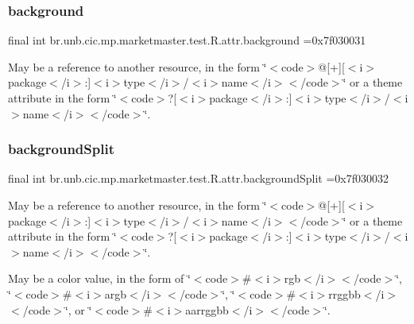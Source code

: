 \subsubsection{\texorpdfstring{background}{background}}
{\footnotesize\ttfamily final int br.\+unb.\+cic.\+mp.\+marketmaster.\+test.\+R.\+attr.\+background =0x7f030031\hspace{0.3cm}{\ttfamily [static]}}

May be a reference to another resource, in the form \char`\"{}$<$code$>$@\mbox{[}+\mbox{]}\mbox{[}$<$i$>$package$<$/i$>$\+:\mbox{]}$<$i$>$type$<$/i$>$/$<$i$>$name$<$/i$>$$<$/code$>$\char`\"{} or a theme attribute in the form \char`\"{}$<$code$>$?\mbox{[}$<$i$>$package$<$/i$>$\+:\mbox{]}$<$i$>$type$<$/i$>$/$<$i$>$name$<$/i$>$$<$/code$>$\char`\"{}. \mbox{\label{classbr_1_1unb_1_1cic_1_1mp_1_1marketmaster_1_1test_1_1R_1_1attr_af9948b93a5aacc58a0c280545ac3428e}} 
\subsubsection{\texorpdfstring{background\+Split}{backgroundSplit}}
{\footnotesize\ttfamily final int br.\+unb.\+cic.\+mp.\+marketmaster.\+test.\+R.\+attr.\+background\+Split =0x7f030032\hspace{0.3cm}{\ttfamily [static]}}

May be a reference to another resource, in the form \char`\"{}$<$code$>$@\mbox{[}+\mbox{]}\mbox{[}$<$i$>$package$<$/i$>$\+:\mbox{]}$<$i$>$type$<$/i$>$/$<$i$>$name$<$/i$>$$<$/code$>$\char`\"{} or a theme attribute in the form \char`\"{}$<$code$>$?\mbox{[}$<$i$>$package$<$/i$>$\+:\mbox{]}$<$i$>$type$<$/i$>$/$<$i$>$name$<$/i$>$$<$/code$>$\char`\"{}. 

May be a color value, in the form of \char`\"{}$<$code$>$\#$<$i$>$rgb$<$/i$>$$<$/code$>$\char`\"{}, \char`\"{}$<$code$>$\#$<$i$>$argb$<$/i$>$$<$/code$>$\char`\"{}, \char`\"{}$<$code$>$\#$<$i$>$rrggbb$<$/i$>$$<$/code$>$\char`\"{}, or \char`\"{}$<$code$>$\#$<$i$>$aarrggbb$<$/i$>$$<$/code$>$\char`\"{}. \mbox{\label{classbr_1_1unb_1_1cic_1_1mp_1_1marketmaster_1_1test_1_1R_1_1attr_ad4db6dd8db117263dd8e5d96f2a3f5a7}} 
